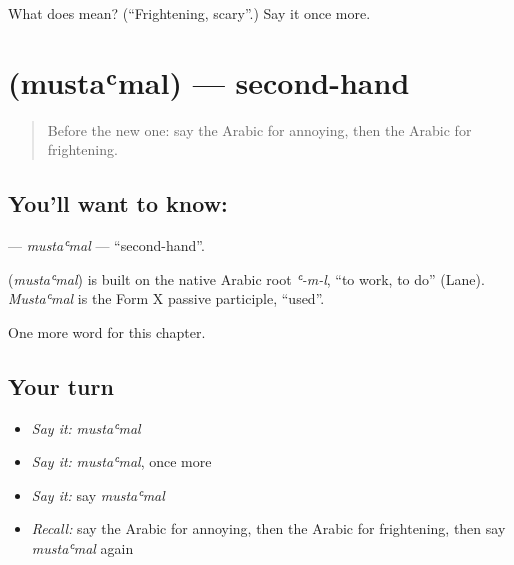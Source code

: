\begin{tcolorbox}[breakable,colback=teal!4,colframe=teal!35!black,title={Before you move on}]
What does  mean? (\textquotedblleft{}Frightening, scary\textquotedblright{}.) Say it once more.
\end{tcolorbox}
\section[\texorpdfstring{\ar{مستعمل} (mustaʿmal)}{مستعمل (mustaʿmal)}]{ (mustaʿmal) — second-hand}

\label{lesson:AR-C243-mustamal}



\begin{quote}
Before the new one: say the Arabic for annoying, then the Arabic for frightening.
\end{quote}

\subsection*{You'll want to know: }
\textbf{} — \emph{mustaʿmal} — \textquotedblleft{}second-hand\textquotedblright{}.

\begin{cousinweb}
\textbf{} (\emph{mustaʿmal}) is built on the native Arabic root \emph{ʿ-m-l}, \textquotedblleft{}to work, to do\textquotedblright{} (Lane). \emph{Mustaʿmal} is the Form X passive participle, \textquotedblleft{}used\textquotedblright{}.
\end{cousinweb}

\begin{grammarlens}[title={What you've built}]
One more word for this chapter.
\end{grammarlens}

\subsection*{Your turn}
\begin{itemize}
\raggedright
  \item \emph{Say it:} \emph{mustaʿmal}
  \item \emph{Say it:} \emph{mustaʿmal}, once more
  \item \emph{Say it:} say \emph{mustaʿmal}
  \item \emph{Recall:} say the Arabic for annoying, then the Arabic for frightening, then say \emph{mustaʿmal} again
\end{itemize}

